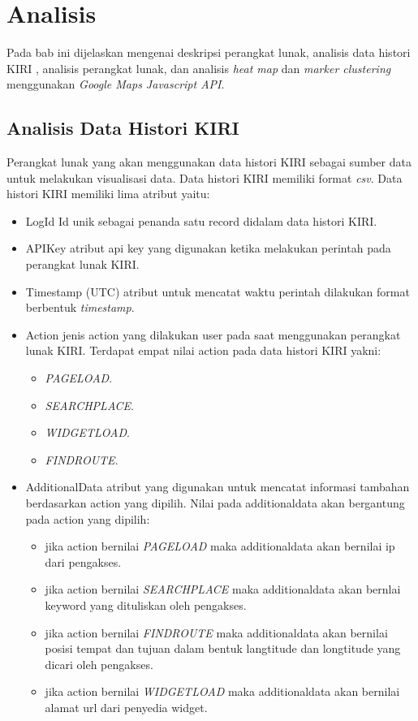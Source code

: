 \chapter{Analisis}
\label{chap:analisis}
Pada bab ini dijelaskan mengenai deskripsi perangkat lunak,  analisis data histori KIRI , analisis perangkat lunak, dan analisis \textit{heat map} dan \textit{marker clustering} menggunakan  \textit{Google Maps Javascript API}.


\section{Analisis Data Histori KIRI}
Perangkat lunak yang akan menggunakan data histori KIRI sebagai sumber data untuk melakukan visualisasi data. Data histori KIRI memiliki format \textit{csv}. Data histori KIRI memiliki lima atribut yaitu:
\begin{itemize}
    \item LogId
    Id unik  sebagai penanda satu record didalam data histori KIRI.
    \item APIKey
     atribut api key yang digunakan ketika melakukan perintah pada perangkat lunak KIRI.
    \item Timestamp (UTC)
    atribut untuk mencatat waktu perintah dilakukan format berbentuk \textit{timestamp}.
    \item Action
    jenis action yang dilakukan user pada saat menggunakan perangkat lunak KIRI. Terdapat empat nilai action pada data histori KIRI yakni:
    \begin{itemize}
        \item \textit{PAGELOAD}.
        \item \textit{SEARCHPLACE}.
        \item \textit{WIDGETLOAD}.
        \item \textit{FINDROUTE}.
    \end{itemize}
    \item AdditionalData atribut yang digunakan untuk mencatat informasi tambahan berdasarkan action yang dipilih. Nilai pada additionaldata akan bergantung pada action yang dipilih:
    \begin{itemize}
        \item jika action bernilai \textit{PAGELOAD} maka additionaldata akan bernilai ip dari pengakses.
        \item jika action bernilai \textit{SEARCHPLACE} maka additionaldata akan bernlai keyword yang dituliskan oleh pengakses.
        \item jika action bernilai \textit{FINDROUTE} maka additionaldata akan bernilai posisi tempat dan tujuan dalam bentuk langtitude dan longtitude  yang dicari oleh pengakses.
        \item jika action bernilai \textit{WIDGETLOAD} maka additionaldata akan bernilai alamat url dari penyedia widget.
    \end{itemize}
\end{itemize}



